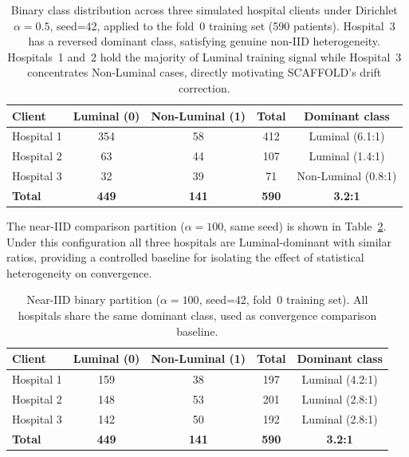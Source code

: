 \begin{table}[htbp]
  \centering
  \caption[Dirichlet non-IID partition ($\alpha=0.5$)]{%
    Binary class distribution across three simulated
    hospital clients under Dirichlet $\alpha=0.5$, seed=42,
    applied to the fold~0 training set (590 patients).
    Hospital~3 has a reversed dominant class, satisfying
    genuine non-IID heterogeneity.
    Hospitals~1 and~2 hold the majority of Luminal
    training signal while Hospital~3 concentrates
    Non-Luminal cases, directly motivating
    SCAFFOLD's drift correction.}
  \label{tab:dirichlet-partition}
  \renewcommand{\arraystretch}{1.3}
  \begin{tabular}{lcccc}
    \toprule
    \textbf{Client} & \textbf{Luminal (0)}
      & \textbf{Non-Luminal (1)} & \textbf{Total}
      & \textbf{Dominant class} \\
    \midrule
    Hospital 1 & 354 & 58  & 412 & Luminal (6.1:1) \\
    Hospital 2 & 63  & 44  & 107 & Luminal (1.4:1) \\
    Hospital 3 & 32  & 39  &  71 & Non-Luminal (0.8:1) \\
    \midrule
    \textbf{Total} & \textbf{449} & \textbf{141}
      & \textbf{590} & \textbf{3.2:1} \\
    \bottomrule
  \end{tabular}
\end{table}

The near-IID comparison partition ($\alpha=100$, same seed)
is shown in Table~\ref{tab:partition-noniid}.
Under this configuration all three hospitals are
Luminal-dominant with similar ratios, providing a
controlled baseline for isolating the effect of
statistical heterogeneity on convergence.

\begin{table}[htbp]
  \centering
  \caption[Near-IID partition ($\alpha=100$)]{%
    Near-IID binary partition ($\alpha=100$, seed=42,
    fold~0 training set). All hospitals share the same
    dominant class, used as convergence comparison baseline.}
  \label{tab:partition-noniid}
  \renewcommand{\arraystretch}{1.3}
  \begin{tabular}{lcccc}
    \toprule
    \textbf{Client} & \textbf{Luminal (0)}
      & \textbf{Non-Luminal (1)} & \textbf{Total}
      & \textbf{Dominant class} \\
    \midrule
    Hospital 1 & 159 & 38 & 197 & Luminal (4.2:1) \\
    Hospital 2 & 148 & 53 & 201 & Luminal (2.8:1) \\
    Hospital 3 & 142 & 50 & 192 & Luminal (2.8:1) \\
    \midrule
    \textbf{Total} & \textbf{449} & \textbf{141}
      & \textbf{590} & \textbf{3.2:1} \\
    \bottomrule
  \end{tabular}
\end{table}

